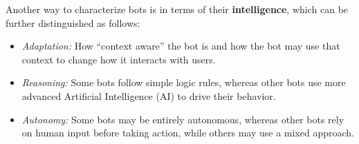 \documentclass{sig-alternate}
\newcommand{\cl}[1]{\textcolor{blue}{{\it [Carly says: #1]}}}
\newcommand{\cl}[1]{}
\begin{document}
Another way to characterize bots is in terms of their \textbf{intelligence}, which can be further distinguished as follows:
\begin{itemize}
\item \emph{Adaptation:} How ``context aware'' the bot is and how the bot may use that context to change how it interacts with users. 
\item \emph{Reasoning:} Some bots follow simple logic rules,
whereas other bots use more advanced Artificial Intelligence (AI) to drive their behavior.
\item \emph{Autonomy:}  Some bots may be entirely autonomous, whereas other bots rely on human input before taking action, while others may use a mixed approach.  
\end{itemize}
\end{document}

